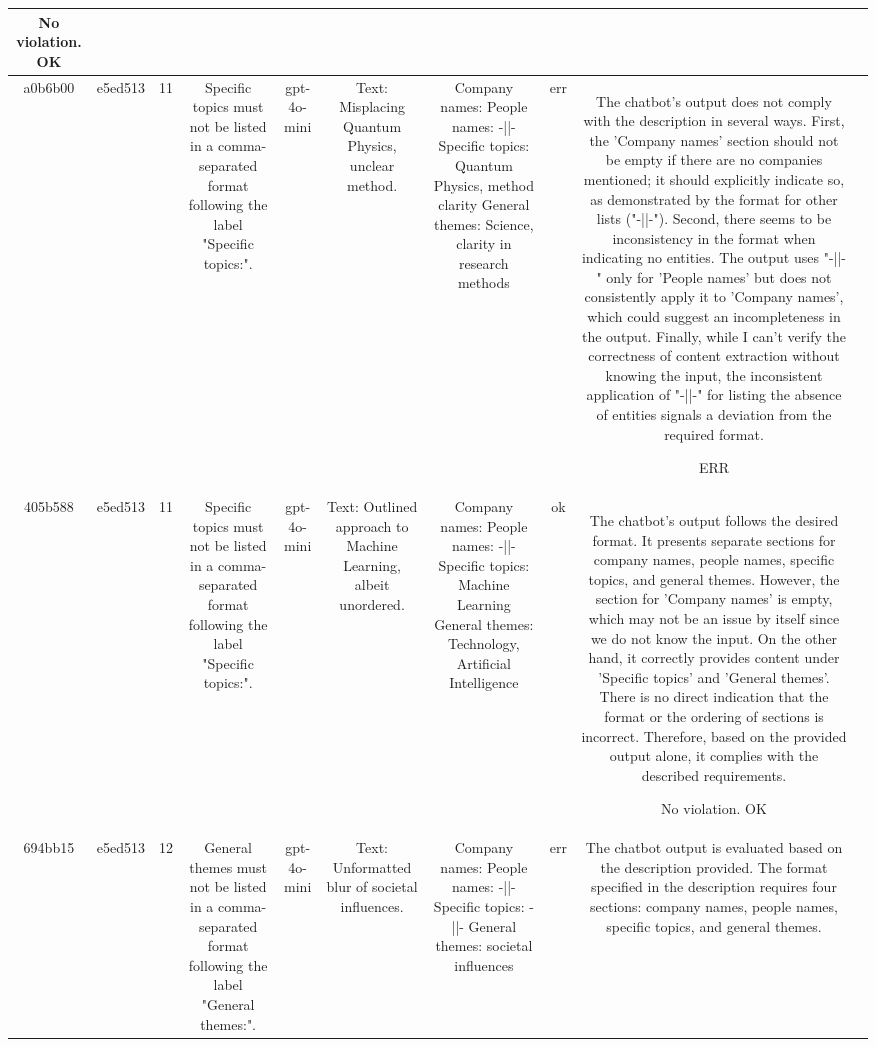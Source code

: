\begin{table}[h!]
\begin{tabular}{|c|c|c|c|c|c|c|c|c|c|}
No violation.
OK & \\
\hline
a0b6b00 & e5ed513 & 11 & Specific topics must not be listed in a comma-separated format following the label "Specific topics:". & gpt-4o-mini & Text: Misplacing Quantum Physics, unclear method. & Company names: 
People names: -||-
Specific topics: Quantum Physics, method clarity
General themes: Science, clarity in research methods & err & The chatbot's output does not comply with the description in several ways. First, the 'Company names' section should not be empty if there are no companies mentioned; it should explicitly indicate so, as demonstrated by the format for other lists ("-||-"). Second, there seems to be inconsistency in the format when indicating no entities. The output uses "-||-" only for 'People names' but does not consistently apply it to 'Company names', which could suggest an incompleteness in the output. Finally, while I can't verify the correctness of content extraction without knowing the input, the inconsistent application of "-||-" for listing the absence of entities signals a deviation from the required format.

ERR & \\
\hline
405b588 & e5ed513 & 11 & Specific topics must not be listed in a comma-separated format following the label "Specific topics:". & gpt-4o-mini & Text: Outlined approach to Machine Learning, albeit unordered. & Company names: 
People names: -||-
Specific topics: Machine Learning
General themes: Technology, Artificial Intelligence & ok & The chatbot's output follows the desired format. It presents separate sections for company names, people names, specific topics, and general themes. However, the section for 'Company names' is empty, which may not be an issue by itself since we do not know the input. On the other hand, it correctly provides content under 'Specific topics' and 'General themes'. There is no direct indication that the format or the ordering of sections is incorrect. Therefore, based on the provided output alone, it complies with the described requirements.

No violation.
OK & \\
\hline
694bb15 & e5ed513 & 12 & General themes must not be listed in a comma-separated format following the label "General themes:". & gpt-4o-mini & Text: Unformatted blur of societal influences. & Company names: 
People names: -||-
Specific topics: -||-
General themes: societal influences & err & The chatbot output is evaluated based on the description provided. The format specified in the description requires four sections: company names, people names, specific topics, and general themes.


\end{tabular}
\end{table}
